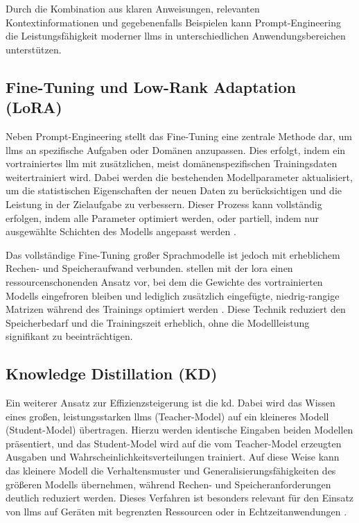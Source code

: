 Durch die Kombination aus klaren Anweisungen, relevanten Kontextinformationen und gegebenenfalls Beispielen kann Prompt-Engineering die Leistungsfähigkeit moderner \glspl{llm} in unterschiedlichen Anwendungsbereichen unterstützen.


\subsection{Fine-Tuning und Low-Rank Adaptation (LoRA)}

Neben Prompt-Engineering stellt das Fine-Tuning eine zentrale Methode dar, um \glspl{llm} an spezifische Aufgaben oder Domänen anzupassen.
Dies erfolgt, indem ein vortrainiertes \gls{llm} mit zusätzlichen, meist domänenspezifischen Trainingsdaten weitertrainiert wird.
Dabei werden die bestehenden Modellparameter aktualisiert, um die statistischen Eigenschaften der neuen Daten zu berücksichtigen und die Leistung in der Zielaufgabe zu verbessern.
Dieser Prozess kann vollständig erfolgen, indem alle Parameter optimiert werden, oder partiell, indem nur ausgewählte Schichten des Modells angepasst werden \autocite{hu_lora_2021}.

Das vollständige Fine-Tuning großer Sprachmodelle ist jedoch mit erheblichem Rechen- und Speicheraufwand verbunden.
\citeauthor{hu_lora_2021} stellen mit der \gls{lora} einen ressourcenschonenden Ansatz vor, bei dem die Gewichte des vortrainierten Modells eingefroren bleiben und lediglich zusätzlich eingefügte, niedrig-rangige Matrizen während des Trainings optimiert werden \autocite{hu_lora_2021}.
Diese Technik reduziert den Speicherbedarf und die Trainingszeit erheblich, ohne die Modellleistung signifikant zu beeinträchtigen.


\subsection{Knowledge Distillation (KD)}

Ein weiterer Ansatz zur Effizienzsteigerung ist die \gls{kd}.
Dabei wird das Wissen eines großen, leistungsstarken \glspl{llm} (Teacher-Model) auf ein kleineres Modell (Student-Model) übertragen.
Hierzu werden identische Eingaben beiden Modellen präsentiert, und das Student-Model wird auf die vom Teacher-Model erzeugten Ausgaben und Wahrscheinlichkeitsverteilungen trainiert.
Auf diese Weise kann das kleinere Modell die Verhaltensmuster und Generalisierungsfähigkeiten des größeren Modells übernehmen, während Rechen- und Speicheranforderungen deutlich reduziert werden.
Dieses Verfahren ist besonders relevant für den Einsatz von \glspl{llm} auf Geräten mit begrenzten Ressourcen oder in Echtzeitanwendungen \autocite{xu_survey_2024}.

